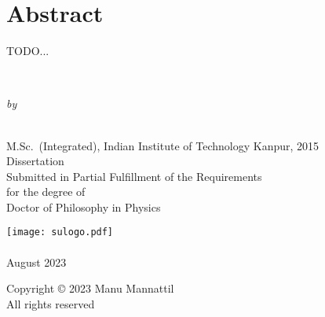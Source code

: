 
\frontmatter

\chapter*{Abstract}\thispagestyle{empty}

TODO...

\makeatletter
  \if@twoside\blankpage\fi
\makeatother


\newpage\thispagestyle{empty}

\begin{center*}
  \begin{Spacing}{2.0}
  {\LARGE{}}\\
  \end{Spacing}
  \vspace{3em}
  \emph{by}\\[3em]
  \\
  \vspace{1em}
  \begin{Spacing}{1.25}
  M.Sc.~(Integrated), Indian Institute of Technology Kanpur, 2015\\[5em]
  Dissertation\\
  Submitted in Partial Fulfillment of the Requirements\\
  for the degree of\\
  Doctor of Philosophy in Physics\\[5em]
  \end{Spacing}
  \texttt{[image: sulogo.pdf]}\\[1em]
  \\[1em]
  August 2023
\end{center*}


\newpage\thispagestyle{empty}

\begin{center*}
  \begin{Spacing}{1.25}
  Copyright {\copyright} 2023 Manu Mannattil\\
  All rights reserved
  \end{Spacing}
\end{center*}

